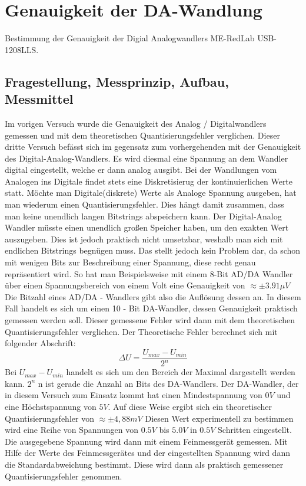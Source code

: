 %
%
\chapter{Genauigkeit der DA-Wandlung}
\label{chap:VERSUCH_3}
 Bestimmung der Genauigkeit der Digial Analogwandlers ME-RedLab USB-1208LLS.
\section{Fragestellung, Messprinzip, Aufbau, Messmittel}
\label{chap:VERSUCH_3_FRAGESTELLUNG}
Im vorigen Versuch wurde die Genauigkeit des Analog / Digitalwandlers gemessen und mit dem 
theoretischen Quantisierungsfehler verglichen. Dieser dritte Versuch befässt sich
im gegensatz zum vorhergehenden mit der Genauigkeit des Digital-Analog-Wandlers.
Es wird diesmal eine Spannung an dem Wandler digital eingestellt, welche er dann analog ausgibt.
Bei der Wandlungen vom Analogen ins Digitale findet stets eine Diskretisierug der kontinuierlichen Werte statt.
Möchte man Digitale(diskrete) Werte als Analoge Spannung ausgeben, hat man wiederum einen Quantisierungsfehler.
Dies hängt damit zusammen, dass man keine unendlich langen Bitstrings abspeichern kann.
Der Digital-Analog Wandler müsste einen unendlich großen Speicher haben, um den exakten Wert auszugeben.
Dies ist jedoch praktisch nicht umsetzbar, weshalb man sich mit endlichen Bitstrings begnügen muss.
Das stellt jedoch kein Problem dar, da schon mit wenigen Bits zur Beschreibung einer Spannung, diese
recht genau repräsentiert wird. 
So hat man Beispielsweise mit einem 8-Bit AD/DA Wandler über einen Spannungsbereich von einem Volt eine Genauigkeit von
$\approx \pm 3.91 \mu V$
Die Bitzahl eines AD/DA - Wandlers gibt also die Auflösung dessen an.
In diesem Fall handelt es sich um einen 10 - Bit DA-Wandler, dessen Genauigkeit 
praktisch gemessen werden soll. Dieser gemessene Fehler wird dann mit dem theoretischen Quantisierungsfehler verglichen.
Der Theoretische Fehler berechnet sich mit folgender Abschrift:
\begin{equation}
\Delta U = \frac{U_{max} - U_{min}}{2^n}
\end{equation}
Bei $U_{max} - U_{min}$ handelt es sich um den Bereich der Maximal dargestellt werden kann. $2^n$ n ist gerade die Anzahl an Bits des DA-Wandlers.
Der DA-Wandler, der in diesem Versuch zum Einsatz kommt hat einen Mindestspannung von $0 V$ und eine Höchstspannung von $5 V$. Auf diese Weise ergibt sich ein theoretischer Quantisierungsfehler von $ \approx \pm 4,88 mV$
Diesen Wert experimentell zu bestimmen wird eine Reihe von Spannungen von $0.5 V$ bis $5.0 V$ in $0.5 V$ Schritten eingestellt. Die ausgegebene Spannung wird dann mit einem Feinmessgerät gemessen. Mit Hilfe der Werte des Feinmessgerätes und der eingestellten Spannung wird dann die Standardabweichung bestimmt. Diese wird dann als praktisch gemessener Quantisierungsfehler genommen.


